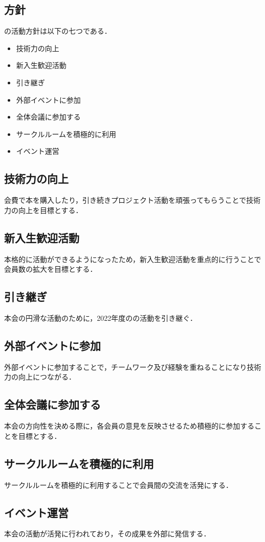 \subsection*{\newGradeIfKouki{}\secondGrade{}方針}


\secondGrade{}の活動方針は以下の七つである．

\begin{itemize}
    \item 技術力の向上
    \item 新入生歓迎活動   
    \item 引き継ぎ
    \item 外部イベントに参加
    \item 全体会議に参加する
    \item サークルルームを積極的に利用
    \item イベント運営
\end{itemize}

\subsection*{技術力の向上}
会費で本を購入したり，引き続きプロジェクト活動を頑張ってもらうことで技術力の向上を目標とする．

\subsection*{新入生歓迎活動}
本格的に活動ができるようになったため，新入生歓迎活動を重点的に行うことで会員数の拡大を目標とする．

\subsection*{引き継ぎ}
本会の円滑な活動のために，2022年度の\secondGrade{}の活動を引き継ぐ．

\subsection*{外部イベントに参加}
外部イベントに参加することで，チームワーク及び経験を重ねることになり技術力の向上につながる．

\subsection*{全体会議に参加する}
本会の方向性を決める際に，各会員の意見を反映させるため積極的に参加することを目標とする．

\subsection*{サークルルームを積極的に利用}
サークルルームを積極的に利用することで会員間の交流を活発にする．

\subsection*{イベント運営}
本会の活動が活発に行われており，その成果を外部に発信する．
